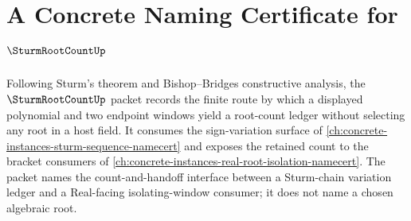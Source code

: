 \chapter{A Concrete Naming Certificate for $\SturmRootCountUp$}
\label{ch:concrete-instances-sturm-root-count-namecert}

Following Sturm's theorem and Bishop--Bridges constructive analysis, the $\SturmRootCountUp$ packet records the finite route by which a displayed polynomial and two endpoint windows yield a root-count ledger without selecting any root in a host field. It consumes the sign-variation surface of \autoref{ch:concrete-instances-sturm-sequence-namecert} and exposes the retained count to the bracket consumers of \autoref{ch:concrete-instances-real-root-isolation-namecert}. The packet names the count-and-handoff interface between a Sturm-chain variation ledger and a Real-facing isolating-window consumer; it does not name a chosen algebraic root.

